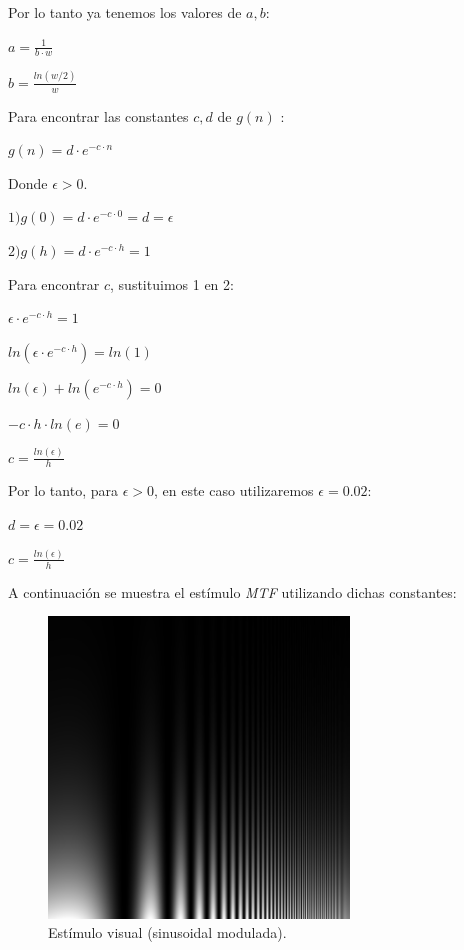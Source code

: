 \documentclass[conference]{IEEEtran}
\def\shadowLine{\vspace{3mm}}
\begin{document}
Por lo tanto ya tenemos los valores de $a, b$:

$a = \displaystyle\frac{1}{b\cdot w}$

\shadowLine
$b = \displaystyle\frac{ln(w/2)}{w}$

Para encontrar las constantes $c,d$ de $g(n)$ :

\shadowLine
$g(n)=d\cdot e^{-c\cdot n}$

Donde $\epsilon>0$.

\shadowLine
$1)g(0)=d\cdot e^{-c\cdot 0} = d = \epsilon$

\shadowLine
$2)g(h)=d\cdot e^{-c\cdot h} = 1$

Para encontrar $c$, sustituimos 1 en 2:

$\epsilon\cdot e^{-c\cdot h}=1$

\shadowLine
$ln(\epsilon\cdot e^{-c\cdot h})=ln(1)$

\shadowLine
$ln(\epsilon) + ln(e^{-c\cdot h})=0$

\shadowLine
$-c\cdot h\cdot ln(e)=0$

\shadowLine
$c = \displaystyle\frac{ln(\epsilon)}{h}$

Por lo tanto, para $\epsilon>0$, en este caso utilizaremos $\epsilon = 0.02$:

$d = \epsilon = 0.02$

\shadowLine
$c = \displaystyle\frac{ln(\epsilon)}{h}$

\shadowLine
A continuación se muestra el estímulo \textit{MTF} utilizando dichas constantes:

\begin{figure}[htbp]
\centerline{\includegraphics[width=80mm]{code/mtf}}
\caption{Estímulo visual (sinusoidal modulada).}
\label{mtf}
\end{figure}
\end{document}
